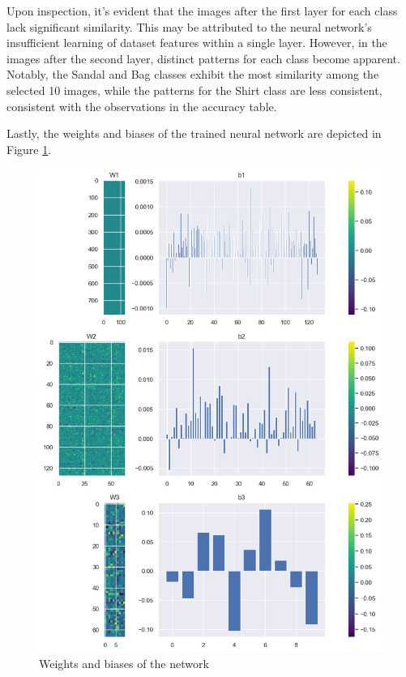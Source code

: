 \documentclass[10pt,a4paper,twoside]{tau}
\begin{document}
Upon inspection, it's evident that the images after the first layer for each class lack significant similarity. This may be attributed to the neural network's insufficient learning of dataset features within a single layer. However, in the images after the second layer, distinct patterns for each class become apparent. Notably, the Sandal and Bag classes exhibit the most similarity among the selected 10 images, while the patterns for the Shirt class are less consistent, consistent with the observations in the accuracy table.

Lastly, the weights and biases of the trained neural network are depicted in Figure \ref{fig:weight-biases}.

\begin{figure}[]
\centering
\includegraphics[scale=0.4]{images/weight_biases.png}
\caption{Weights and biases of the network}
\label{fig:weight-biases}
\end{figure}
\end{document}
